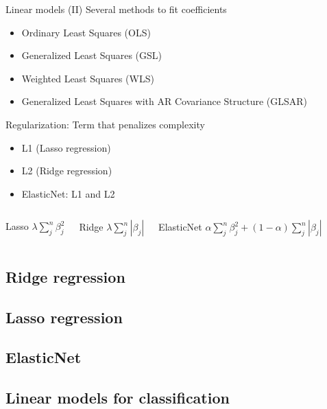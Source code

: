 \documentclass[10pt,compress]{beamer} %
\begin{document}
\begin{frame}{Linear models (II)}
	Several methods to fit coefficients
	\begin{itemize}
		\item Ordinary Least Squares (OLS)
        \item Generalized Least Squares (GSL)
        \item Weighted Least Squares (WLS)
		\item Generalized Least Squares with AR Covariance Structure (GLSAR)
	\end{itemize}

	\alert{Regularization}: Term that penalizes complexity
	\begin{itemize}
		\item L1 (Lasso regression) 
		\item L2 (Ridge regression)
		\item ElasticNet: L1 and L2
	\end{itemize}

    \begin{columns}
    		\begin{block}{Lasso}
            	$\lambda \sum_j^n \beta_j^2$
        	\end{block}

     		\begin{block}{Ridge}
            	$\lambda \sum_j^n |\beta_j|$
        	\end{block}
     		\begin{block}{ElasticNet}
			$\alpha  \sum_j^n \beta_j^2 + (1-\alpha) \sum_j^n |\beta_j|$
        	\end{block}
    \end{columns}

\end{frame}

\subsection{Ridge regression}
\subsection{Lasso regression}
\subsection{ElasticNet}
\subsection{Linear models for classification}
\end{document}

